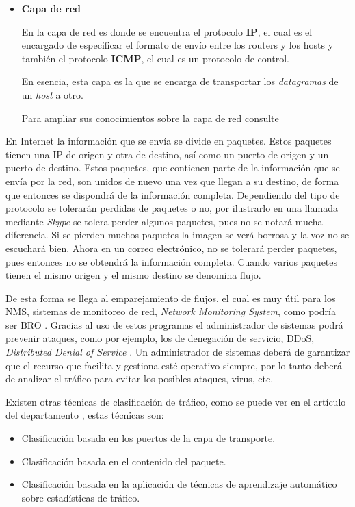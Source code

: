 \begin{itemize}
\item \textbf{Capa de red}

En la capa de red es donde se encuentra el protocolo \textbf{IP}, el cual es el encargado de especificar 
el formato de envío entre los routers y los hosts y también el protocolo \textbf{ICMP}, el cual 
es un protocolo de control.

\intro En esencia, esta capa es la que se encarga de transportar los \textit{datagramas} de un \textit{host} a otro.

\intro Para ampliar sus conocimientos sobre la capa de red consulte \cite{redes2010d}

\end{itemize}

\intro En Internet la información que se envía se divide en paquetes. Estos paquetes tienen una IP de 
origen y otra de destino, así como un puerto de origen y un puerto de destino. Estos paquetes, que contienen 
parte de la información que se envía por la red, son unidos de nuevo una vez que llegan a su destino, de forma 
que entonces se dispondrá de la información completa. Dependiendo del tipo de protocolo se tolerarán perdidas 
de paquetes o no, por ilustrarlo en una llamada mediante \textit{Skype} se tolera perder algunos paquetes, 
pues no se notará mucha diferencia. Si se pierden muchos paquetes la imagen se verá borrosa 
y la voz no se escuchará bien. Ahora en un correo electrónico, no se tolerará perder paquetes, 
pues entonces no se obtendrá la información completa. Cuando varios paquetes tienen el mismo origen y 
el mismo destino se denomina flujo. \cite{redes2010a}

\intro De esta forma se llega al emparejamiento de flujos, el cual es muy útil para los NMS, 
sistemas de monitoreo de red, \textit{Network Monitoring System}, como podría ser BRO \cite{broindex}.
Gracias al uso de estos programas el administrador de sistemas podrá prevenir ataques, como por ejemplo, los 
de denegación de servicio, DDoS, \textit{Distributed Denial of Service} \cite{redes2010e}. Un administrador 
de sistemas deberá de garantizar que el recurso que facilita y gestiona esté operativo siempre, 
por lo tanto deberá de analizar el tráfico para evitar los posibles ataques, virus, etc.

\intro Existen otras técnicas de clasificación de tráfico, como se puede ver en el artículo del 
departamento \citep{comparacion}, estas técnicas son: 

\begin{itemize}
\item Clasificación basada en los puertos de la capa de transporte. \cite{iana}
\item Clasificación basada en el contenido del paquete. \cite{payload}
\item Clasificación basada en la aplicación de técnicas de aprendizaje automático sobre estadísticas 
de tráfico. \cite{learning}
\end{itemize}

